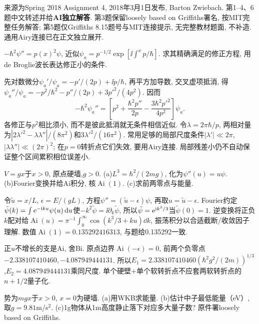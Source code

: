 来源为Spring 2018 Assignment 4, 2018年3月1日发布, Barton Zwiebach. 第1--4、6题中文转述并给\textbf{AI独立解答}. 第3题保留loosely based on Griffiths署名, 按MIT完整任务解答; 第5题仅Griffiths 8.15题号与MIT连接提示, 无完整教材题面, 不补造. 通用Airy连接已在正文独立展开.
\begin{exercise}
$-\hbar^2\psi''=p(x)^2\psi$, 近似$\psi_a=p^{-1/2}\exp[\ii\int^xp/\hbar]$. 求其精确满足的修正方程, 用de Broglie波长表达修正小的条件.
\end{exercise}
\begin{solution}
先对数微分$\psi_a'/\psi_a=-p'/(2p)+\ii p/\hbar$, 再平方加导数, 交叉虚项抵消, 得$\psi_a''/\psi_a=-p^2/\hbar^2-p''/(2p)+3p'^2/(4p^2)$. 因而
\[
-\hbar^2\psi_a''=\left[p^2+\frac{\hbar^2p''}{2p}-\frac{3\hbar^2p'^2}{4p^2}\right]\psi_a.
\]
各修正与$p^2$相比须小, 而不是彼此抵消就无条件相信近似. 令$\lambda=2\pi\hbar/p$, 两相对量为$|2\lambda'^2-\lambda\lambda''|/(8\pi^2)$和$3\lambda'^2/(16\pi^2)$. 常用足够的局部尺度条件$|\lambda'|\ll2\pi$, $|\lambda\lambda''|\ll(2\pi)^2$; 在$p=0$转折点它们失效, 要用Airy连接. 局部残差小仍不自动保证整个区间累积相位误差小.
\end{solution}
\begin{exercise}
$V=gx$于$x>0$, 原点硬墙,$g>0$. (a)$L^3=\hbar^2/(2mg)$, 化为$\psi''(u)=u\psi$. (b)Fourier变换并给Ai积分, 核$\operatorname{Ai}(1)$. (c)求前两零点与能量.
\end{exercise}
\begin{solution}
令$\tilde u=x/L$, $\epsilon=E/(gL)$, 方程$\psi''=(\tilde u-\epsilon)\psi$, 再取$u=\tilde u-\epsilon$. Fourier约定$\tilde\psi(k)=\int\mathrm e^{-\mathrm i ku}\psi(u)\,\mathrm d u$使$-k^2\tilde\psi=\ii\partial_k\tilde\psi$, 所以$\tilde\psi=\mathrm e^{\mathrm i k^3/3}$当$\tilde\psi(0)=1$. 逆变换将正负$k$配对给$\operatorname{Ai}(u)=\pi^{-1}\int_0^\infty\cos(k^3/3+ku)\dd k$, 振荡积分以合适截断/收敛因子理解. 数值$\operatorname{Ai}(1)=0.135292416313$, 与题给0.135292一致.

正$u$不增长的支是Ai, 舍Bi. 原点边界$\operatorname{Ai}(-\epsilon)=0$, 前两个负零点$-2.338107410460,-4.087949444131$. 所以$E_1=2.338107410460(\hbar^2g^2/(2m))^{1/3}$,$E_2=4.087949444131$乘同尺度. 单个硬壁+单个软转折点不应套两软转折点的$n+1/2$量子化.
\end{solution}
\begin{exercise}
势为$mgx$于$x>0$, $x=0$为硬墙. (a)用WKB求能量. (b)估计中子最低能量（eV）, 取$g=9.81$m/s$^2$. (c)1g物体从1m高度静止落下对应多大量子数? 原件署loosely based on Griffiths.
\end{exercise}
